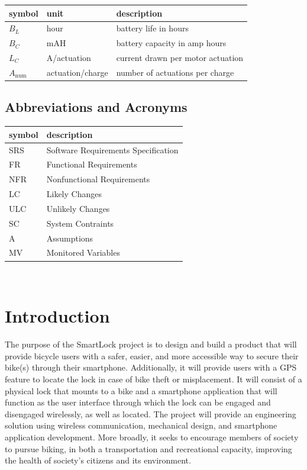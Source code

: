 \documentclass[12pt]{article}
\begin{document}
\renewcommand{\arraystretch}{1.2}
\noindent \begin{longtable*}{l l p{12cm}} \toprule
\textbf{symbol} & \textbf{unit} & \textbf{description}\\
\midrule 
$B_L$ & hour & battery life in hours\\
$B_C$ & mAH & battery capacity in amp hours\\
$L_C$ & A/actuation & current drawn per motor actuation\\
$A_\text{num}$ & actuation/charge & number of actuations per charge\\ 
\bottomrule
\end{longtable*}


\subsection{Abbreviations and Acronyms}

\renewcommand{\arraystretch}{1.2}
\begin{tabular}{l l} 
  \toprule		
  \textbf{symbol} & \textbf{description}\\
  \midrule 
  SRS & Software Requirements Specification\\
  FR & Functional Requirements\\
  NFR & Nonfunctional Requirements\\
  LC & Likely Changes\\
  ULC & Unlikely Changes\\
  SC & System Contraints\\
  A & Assumptions\\
  MV & Monitored Variables\\
  \bottomrule
\end{tabular}\\






\section{Introduction}

The purpose of the SmartLock project is to design and build a product that will provide bicycle users with a safer, easier, and more accessible way to secure their bike(s) through their smartphone. Additionally, it will provide users with a GPS feature to locate the lock in case of bike theft or misplacement.  It will consist of a physical lock that mounts to a bike and a smartphone application that will function as the user interface through which the lock can be engaged and disengaged wirelessly, as well as located. The project will provide an engineering solution using wireless communication, mechanical design, and smartphone application development. More broadly, it seeks to encourage members of society to pursue biking, in both a transportation and recreational capacity, improving the health of society’s citizens and its environment.  
\end{document}
